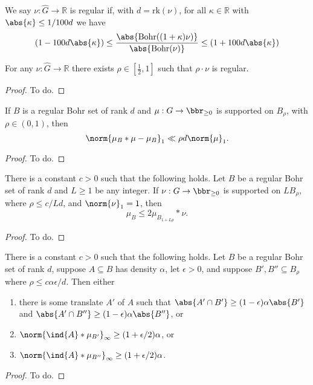 \begin{definition}[Regularity]
\label{bohr-reg-def}
\leanok
We say $\nu:\widehat{G}\to \mathbb{R}$ is regular if, with $d=\mathrm{rk}(\nu)$, for all $\kappa\in\mathbb{R}$ with $\abs{\kappa}\leq 1/100d$ we have
\[(1-100 d\abs{\kappa})\leq \frac{\abs{\mathrm{Bohr}((1+\kappa)\nu)}}{\abs{\mathrm{Bohr}(\nu)}}\leq(1+ 100 d\abs{\kappa})\]
\end{definition}

\begin{lemma}
\label{bohr-regularity}
\leanok
For any $\nu:\widehat{G}\to \mathbb{R}$ there exists $\rho\in[\frac{1}{2},1]$ such that $\rho\cdot \nu$ is regular.
\end{lemma}
\begin{proof}
To do.
\end{proof}

\begin{lemma}
\label{reg-conv}
If $B$ is a regular Bohr set of rank $d$ and $\mu:G\to\bbr_{\geq 0}$ is supported on $B_\rho$, with $\rho \in (0,1)$, then
\[ \norm{ \mu_B*\mu - \mu_B }_{1} \ll \rho d\norm{\mu}_1. \]
\end{lemma}
\begin{proof}
To do.
\end{proof}

\begin{lemma}
\label{bohr-majorise}
There is a constant $c>0$ such that the following holds.  Let $B$ be a regular Bohr set of rank $d$ and $L\geq 1$ be any integer. If $\nu:G\to\bbr_{\geq 0}$ is supported on $L B_\rho$, where $\rho \leq c/Ld$, and $\norm{\nu}_1=1$, then
\[\mu_B \leq 2\mu_{B_{1+L\rho}}\ast \nu.\]
\end{lemma}
\begin{proof}
To do.
\end{proof}

\begin{lemma}
\label{bourgain-trick}
There is a constant $c>0$ such that the following holds. Let $B$ be a regular Bohr set of rank $d$, suppose $A\subseteq B$ has density $\alpha$, let $\epsilon>0$, and suppose $B',B''\subseteq B_\rho$ where $\rho\leq c\alpha\epsilon/d$. Then either
\begin{enumerate}
\item there is some translate $A'$ of $A$ such that $\abs{A'\cap B'}\geq (1-\epsilon)\alpha\abs{B'}$ and $\abs{A'\cap B''}\geq (1-\epsilon)\alpha \abs{B''}$, or
\item $\norm{\ind{A}\ast \mu_{B'}}_\infty\geq (1+\epsilon/2)\alpha$, or
\item $\norm{\ind{A}\ast \mu_{B''}}_\infty \geq (1+\epsilon/2)\alpha$.
\end{enumerate}
\end{lemma}
\begin{proof}
To do.
\end{proof}
